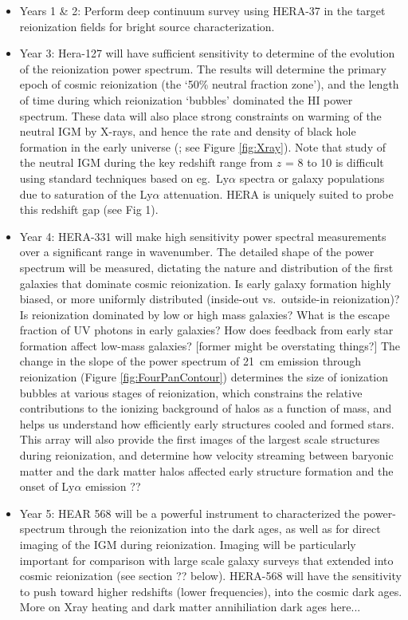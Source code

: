 \documentclass[preprint]{aastex}
\begin{document}
\begin{itemize}

\item Years 1 \& 2: Perform deep continuum survey using HERA-37 in the target reionization fields for bright source characterization. 

\item Year 3: Hera-127 will have sufficient sensitivity to determine of the evolution of the reionization power spectrum. The results will determine the primary epoch of cosmic reionization (the `50\% neutral fraction zone'), and the length of time during which reionization `bubbles' dominated the HI power spectrum. These data will also place strong constraints on warming of the neutral IGM by X-rays, and hence the rate and density of black hole formation in the
early universe (\citealt{pritchard_XXX}; see Figure \ref{fig:Xray}). Note that study of the neutral IGM during the key redshift range from $z$ = 8 to 10 is difficult using standard techniques based on eg.\ Ly$\alpha$ spectra or galaxy populations due to saturation of the Ly$\alpha$ attenuation. HERA is uniquely suited to probe this redshift gap (see Fig 1). 

\item Year 4: HERA-331 will make high sensitivity power spectral measurements over a significant range in wavenumber. The detailed shape of the power spectrum will be measured, dictating the nature and distribution of the first galaxies that dominate cosmic  reionization. Is early galaxy formation highly biased, or more uniformly distributed (inside-out vs.\ outside-in reionization)? Is reionization dominated by low or high mass galaxies? What is the escape fraction of UV photons in early galaxies? How does feedback from early star formation affect low-mass galaxies? [former might be overstating things?] The change in the slope of the power spectrum of 21~cm emission through reionization (Figure \ref{fig:FourPanContour}) determines the size of ionization bubbles at various stages of reionization, which constrains the relative contributions to the ionizing background of halos as a function of mass, and helps us understand how efficiently early structures cooled and formed stars. This array will also provide the first images of the largest scale structures during reionization, and determine how velocity streaming between baryonic  matter and the dark matter halos affected early structure formation and the onset of Ly$\alpha$ emission \citep{visbal_et_al2012}??

\item Year 5: HEAR 568 will be a powerful instrument to characterized the power-spectrum through the reionization into the dark ages, as well as for direct imaging of the IGM during reionization. Imaging will be particularly important for comparison with large scale galaxy surveys that extended into cosmic reionization (see section ?? below). HERA-568 will have the sensitivity to push toward higher redshifts (lower frequencies), into the cosmic dark ages. More on Xray heating and dark matter annihiliation dark ages here...

\end{itemize}
\end{document}
